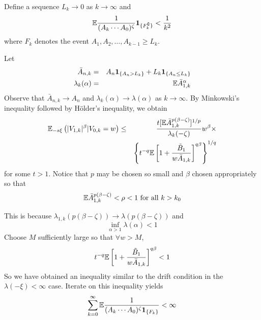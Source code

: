 \documentclass{beamer}
\begin{document}
\begin{frame}
  Define a sequence $L_k \to 0$ as $k \to \infty$ and
  \[
  \mathbb{E} {
    1 \over
    (A_k \cdots A_0)^\zeta
  }  \mathbf{1}_{\{F_k^\complement\}} < {1 \over k^2}
  \]
  where $F_k$ denotes the event $A_1, A_2, \dots, A_{k-1} \geq L_k$.
\end{frame}

\begin{frame}
  Let
  \begin{eqnarray*}
    \bar A_{n,k} &=& A_{n} \mathbf{1}_{\{A_n > L_k\}} + L_k \mathbf{1}_{\{A_n \leq L_k\}} \\
    \lambda_k(\alpha) &=& \mathbb{E} \bar A_{1,k}^\alpha
  \end{eqnarray*}
  Observe that $\bar A_{n,k} \to A_n$ and $\lambda_k(\alpha) \to
  \lambda(\alpha)$ as $k \to \infty$. By Minkowski's inequality
  followed by H\"older's inequality, we obtain
  \begin{eqnarray*}
    \mathbb{E}_{-s\xi} \left( |V_{1,k}|^\beta | V_{0,k} = w\right) &\leq& {
    t [\mathbb{E} \bar A_{1,k}^{p(\beta - \zeta)}]^{1/p}
    \over
    \lambda_k(-\zeta)
  } w^\beta \times \\
  && \left\{
    t^{-q} \mathbb{E} \left[
      1 + {
        \tilde B_1
        \over
        w \bar A_{1,k}
      }
    \right]^{q\beta}
  \right\}^{1/q}
  \end{eqnarray*}
  for some $t > 1$. Notice that $p$ may be chosen so small and $\beta$
  chosen appropriately so that
  \[
  \mathbb{E} \bar A_{1,k}^{p(\beta - \zeta)} < \rho < 1 \text{ for all } k > k_0
  \]
\end{frame}

\begin{frame}
  This is because $\lambda_{1,k}(p(\beta - \zeta)) \to \lambda(p(\beta
  - \zeta))$ and
  \[
  \inf_{\alpha > 1} \lambda(\alpha) < 1
  \]
  Choose $M$ sufficiently large so that $\forall w > M$,
  \[
    t^{-q} \mathbb{E} \left[
      1 + {
        \tilde B_1
        \over
        w \bar A_{1,k}
      }
    \right]^{q\beta} < 1
  \]
  So we have obtained an inequality similar to the drift condition in
  the $\lambda(-\xi) < \infty$ case. Iterate on this inequality yields
  \[
  \sum_{k=0}^\infty \mathbb{E} {
    1 \over
    (A_k \cdots A_0)^\zeta \mathbf{1}_{\{F_k\}}
  } < \infty
  \]

\end{frame}


\end{document}
